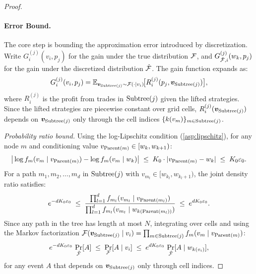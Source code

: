 \begin{proof}
\paragraph{Error Bound.}
The core step is bounding the approximation error introduced by discretization. Write $G^{(j)}_i(v_i, p_j)$ for the gain under the true distribution $\mathcal{F}$, and $G^{(j)}_{\hat{\mathcal{F}},i}(w_k, p_j)$ for the gain under the discretized distribution $\hat{\mathcal{F}}$. The gain function expands as:
\[
G^{(j)}_i(v_i, p_j) = \mathbb{E}_{{\bm{v}}_{\operatorname{Subtree}(j)} \sim \mathcal{F}(\cdot|v_i)}\!\big[R^{(j)}_i(p_j, {\bm{v}}_{\operatorname{Subtree}(j)})\big],
\]
where $R^{(j)}_i$ is the profit from trades in $\operatorname{Subtree}(j)$ given the lifted strategies. Since the lifted strategies are piecewise constant over grid cells, $R^{(j)}_i({\bm{v}}_{\operatorname{Subtree}(j)})$ depends on ${\bm{v}}_{\operatorname{Subtree}(j)}$ only through the cell indices $\{k(v_m)\}_{m \in \operatorname{Subtree}(j)}$.

\emph{Probability ratio bound.} Using the log-Lipschitz condition (\cref{asp:lipschitz}), for any node $m$ and conditioning value $v_{\operatorname{Parent}(m)} \in [w_k, w_{k+1})$:
\[
\big|\log f_m(v_m \mid v_{\operatorname{Parent}(m)}) - \log f_m(v_m \mid w_k)\big| \;\le\; K_0 \cdot |v_{\operatorname{Parent}(m)} - w_k| \;\le\; K_0 \varepsilon_0.
\]
For a path $m_1, m_2, \ldots, m_d$ in $\operatorname{Subtree}(j)$ with $v_{m_l} \in [w_{k_l}, w_{k_l+1})$, the joint density ratio satisfies:
\begin{equation}
\label{eq:prf:fptas:density-ratio}
e^{-d K_0 \varepsilon_0} \;\le\; \frac{\prod_{l=1}^d f_{m_l}(v_{m_l} \mid v_{\operatorname{Parent}(m_l)})}{\prod_{l=1}^d f_{m_l}(v_{m_l} \mid w_{k(\operatorname{Parent}(m_l))})} \;\le\; e^{d K_0 \varepsilon_0}.
\end{equation}
Since any path in the tree has length at most $N$, integrating over cells and using the Markov factorization $\mathcal{F}({\bm{v}}_{\operatorname{Subtree}(j)} \mid v_i) = \prod_{m \in \operatorname{Subtree}(j)} f_m(v_m \mid v_{\operatorname{Parent}(m)})$:
\begin{equation}
\label{eq:fptas:prob-bound}
e^{-dK_0\varepsilon_0}\,\Pr_{\hat{\mathcal{F}}}[A] \;\le\; \Pr_{\mathcal{F}}[A \mid v_i] \;\le\; e^{dK_0\varepsilon_0}\,\Pr_{\hat{\mathcal{F}}}[A \mid w_{k(v_i)}],
\end{equation}
for any event $A$ that depends on ${\bm{v}}_{\operatorname{Subtree}(j)}$ only through cell indices.


\end{proof}

